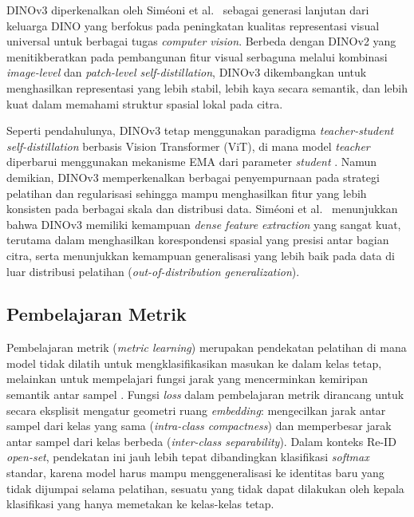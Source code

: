DINOv3 diperkenalkan oleh Sim\'{e}oni et al.\ \cite{simeoni2025dinov3} sebagai generasi lanjutan dari keluarga DINO yang berfokus pada peningkatan kualitas representasi visual universal untuk berbagai tugas \textit{computer vision}. Berbeda dengan DINOv2 yang menitikberatkan pada pembangunan fitur visual serbaguna melalui kombinasi \textit{image-level} dan \textit{patch-level self-distillation}, DINOv3 dikembangkan untuk menghasilkan representasi yang lebih stabil, lebih kaya secara semantik, dan lebih kuat dalam memahami struktur spasial lokal pada citra.
 
Seperti pendahulunya, DINOv3 tetap menggunakan paradigma \textit{teacher-student self-distillation} berbasis Vision Transformer (ViT), di mana model \textit{teacher} diperbarui menggunakan mekanisme EMA dari parameter \textit{student} \cite{simeoni2025dinov3}. Namun demikian, DINOv3 memperkenalkan berbagai penyempurnaan pada strategi pelatihan dan regularisasi sehingga mampu menghasilkan fitur yang lebih konsisten pada berbagai skala dan distribusi data. Sim\'{e}oni et al.\ \cite{simeoni2025dinov3} menunjukkan bahwa DINOv3 memiliki kemampuan \textit{dense feature extraction} yang sangat kuat, terutama dalam menghasilkan korespondensi spasial yang presisi antar bagian citra, serta menunjukkan kemampuan generalisasi yang lebih baik pada data di luar distribusi pelatihan (\textit{out-of-distribution generalization}).

\subsection{Pembelajaran Metrik}
Pembelajaran metrik (\textit{metric learning}) merupakan pendekatan pelatihan di mana model tidak dilatih untuk mengklasifikasikan masukan ke dalam kelas tetap, melainkan untuk mempelajari fungsi jarak yang mencerminkan kemiripan semantik antar sampel \cite{schroff2015facenet}. Fungsi \textit{loss} dalam pembelajaran metrik dirancang untuk secara eksplisit mengatur geometri ruang \textit{embedding}: mengecilkan jarak antar sampel dari kelas yang sama (\textit{intra-class compactness}) dan memperbesar jarak antar sampel dari kelas berbeda (\textit{inter-class separability}). Dalam konteks Re-ID \textit{open-set}, pendekatan ini jauh lebih tepat dibandingkan klasifikasi \textit{softmax} standar, karena model harus mampu menggeneralisasi ke identitas baru yang tidak dijumpai selama pelatihan, sesuatu yang tidak dapat dilakukan oleh kepala klasifikasi yang hanya memetakan ke kelas-kelas tetap.
 
